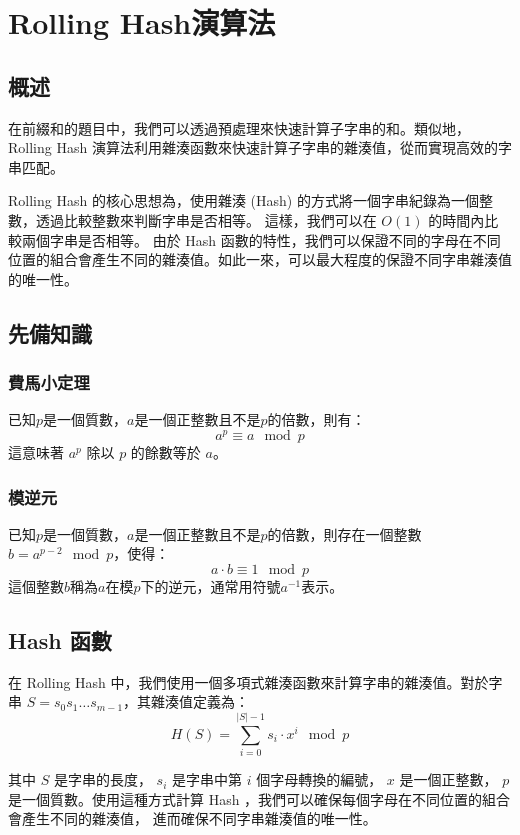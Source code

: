 \documentclass[12pt,a4paper]{article}
\begin{document}
\section{Rolling Hash演算法}

\subsection{概述}

在前綴和的題目中，我們可以透過預處理來快速計算子字串的和。類似地，Rolling Hash 演算法利用雜湊函數來快速計算子字串的雜湊值，從而實現高效的字串匹配。

Rolling Hash 的核心思想為，使用雜湊 (Hash) 的方式將一個字串紀錄為一個整數，透過比較整數來判斷字串是否相等。
這樣，我們可以在 $O(1)$ 的時間內比較兩個字串是否相等。
由於 Hash 函數的特性，我們可以保證不同的字母在不同位置的組合會產生不同的雜湊值。如此一來，可以最大程度的保證不同字串雜湊值的唯一性。

\subsection{先備知識}

\subsubsection{費馬小定理}

已知$p$是一個質數，$a$是一個正整數且不是$p$的倍數，則有：
$$a^p\equiv a \mod p$$
這意味著 $a^p$ 除以 $p$ 的餘數等於 $a$。

\subsubsection{模逆元}
已知$p$是一個質數，$a$是一個正整數且不是$p$的倍數，則存在一個整數$b = a^{p-2} \mod p$，使得：
$$a \cdot b \equiv 1 \mod p$$
這個整數$b$稱為$a$在模$p$下的逆元，通常用符號$a^{-1}$表示。

\subsection{Hash 函數}

在 Rolling Hash 中，我們使用一個多項式雜湊函數來計算字串的雜湊值。對於字串 $S = s_0 s_1 \ldots s_{m-1}$，其雜湊值定義為：
$$H(S)=\displaystyle\sum_{i=0}^{|S|-1} s_i \cdot x^i \mod p$$

其中 $S$ 是字串的長度， $s_i$ 是字串中第 $i$ 個字母轉換的編號， $x$ 是一個正整數， $p$ 是一個質數。使用這種方式計算 Hash ，我們可以確保每個字母在不同位置的組合會產生不同的雜湊值，
進而確保不同字串雜湊值的唯一性。
\end{document}

